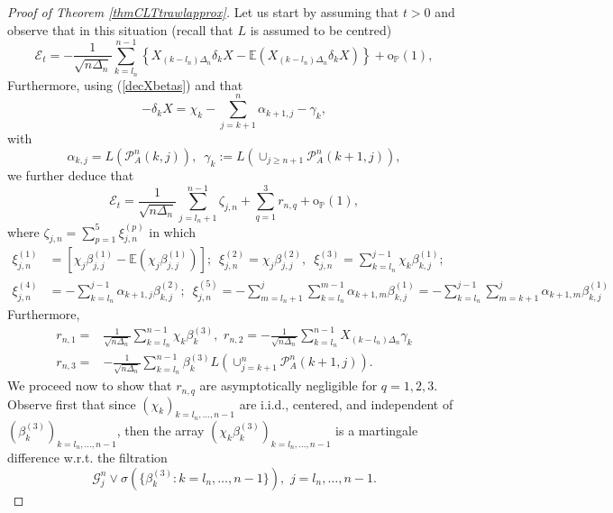 \documentclass{article}
\theoremstyle{plain}
\theoremstyle{definition}
\theoremstyle{remark}
\begin{document}
\begin{appendix}
\begin{proof}[Proof of Theorem  \ref{thmCLTtrawlapprox}]
	Let us start by assuming that $t>0$ and observe that in this situation
	(recall that $L$ is assumed to be centred) 
	\[
	\mathcal{E}_{t}=-\frac{1}{\sqrt{n\Delta_{n}}}\sum_{k=l_{n}}^{n-1}\left\{ X_{(k-l_{n})\Delta_{n}}\delta_{k}X-\mathbb{E}\left(X_{(k-l_{n})\Delta_{n}}\delta_{k}X\right)\right\} +\mathrm{o}_{\mathbb{P}}(1),
	\]
	Furthermore, using (\ref{decXbetas}) and that
	\begin{equation}
		-\delta_{k}X=  \chi_{k}-\sum_{j=k+1}^{n}\alpha_{k+1,j}-\gamma_{k},\label{incremrel}
	\end{equation}
	with
	\begin{equation}
		\alpha_{k,j}=L(\mathcal{P}_{A}^{n}(k,j)),\,\,\,\gamma_{k}:=L(\cup_{j\geq n+1}\mathcal{P}_{A}^{n}(k+1,j)),\label{defalpha}
	\end{equation}
	we further deduce that 
	\begin{equation}
		\mathcal{E}_{t}=\frac{1}{\sqrt{n\Delta_{n}}}\sum_{j=l_{n}+1}^{n-1}\zeta_{j,n}+\sum_{q=1}^{3}r_{n,q}+\mathrm{o}_{\mathbb{P}}(1),\label{errorrepmtg0}
	\end{equation}
	where $\zeta_{j,n}=\sum_{p=1}^{5}\xi_{j,n}^{(p)}$ in which 
	\begin{equation}
		\begin{aligned}\xi_{j,n}^{(1)} & =\left[\chi_{j}\beta_{j,j}^{(1)}-\mathbb{E}(\chi_{j}\beta_{j,j}^{(1)})\right];\,\,\,\xi_{j,n}^{(2)}=\chi_{j}\beta_{j,j}^{(2)},\,\,\,\xi_{j,n}^{(3)}=\sum_{k=l_{n}}^{j-1}\chi_{k}\beta_{k,j}^{(1)};\\
			\xi_{j,n}^{(4)} & =-\sum_{k=l_{n}}^{j-1}\alpha_{k+1,j}\beta_{k,j}^{(2)};\,\,\,\xi_{j,n}^{(5)}=-\sum_{m=l_{n}+1}^{j}\sum_{k=l_{n}}^{m-1}\alpha_{k+1,m}\beta_{k,j}^{(1)}=-\sum_{k=l_{n}}^{j-1}\sum_{m=k+1}^{j}\alpha_{k+1,m}\beta_{k,j}^{(1)}
		\end{aligned}
		\label{errorstpos}
	\end{equation}
	Furthermore, 
\begin{equation}\label{residuals_def}
\begin{aligned}r_{n,1}= & \frac{1}{\sqrt{n\Delta_{n}}}\sum_{k=l_{n}}^{n-1}\chi_{k}\beta_{k}^{(3)},\,\,r_{n,2}=-\frac{1}{\sqrt{n\Delta_{n}}}\sum_{k=l_{n}}^{n-1}X_{(k-l_{n})\Delta_{n}}\gamma_{k}\\
r_{n,3}= & -\frac{1}{\sqrt{n\Delta_{n}}}\sum_{k=l_{n}}^{n-1}\beta_{k}^{(3)}L(\cup_{j=k+1}^{n}\mathcal{P}_{A}^{n}(k+1,j)).
\end{aligned}
\end{equation}    
	We proceed now to show that $r_{n,q}$ are asymptotically negligible
	for $q=1,2,3$. Observe first that since $(\chi_{k})_{k=l_{n},\ldots,n-1}$
	are i.i.d., centered, and independent of $(\beta_{k}^{(3)})_{k=l_{n},\ldots,n-1}$,
	then the array $(\chi_{k}\beta_{k}^{(3)})_{k=l_{n},\ldots,n-1}$ is
	a martingale difference w.r.t. the filtration 
	\[
	\mathscr{G}_{j}^{n}\lor\sigma(\{\beta_{k}^{(3)}:k=l_{n},\ldots,n-1\}),\,\,j=l_{n},\ldots,n-1.
	\]
	

\end{proof}
\end{appendix}
\end{document}
